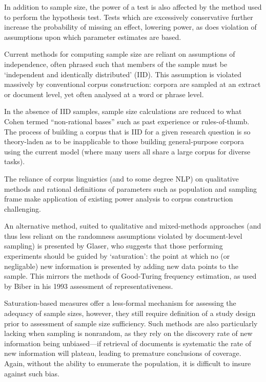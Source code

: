 In addition to sample size, the power of a test is also affected by the method used to perform the hypothesis test.  Tests which are excessively conservative further increase the probability of missing an effect, lowering power, as does violation of assumptions upon which parameter estimates are based.

Current methods for computing sample size are reliant on assumptions of independence, often phrased such that members of the sample must be `independent and identically distributed' (IID).  This assumption is violated massively by conventional corpus construction: corpora are sampled at an extract or document level, yet often analysed at a word or phrase level.

In the absence of IID samples, sample size calculations are reduced to what Cohen\cite[p. 145]{cohen1977statistical} termed ``non-rational bases'' such as past experience or rules-of-thumb.  The process of building a corpus that is IID for a given research question is so theory-laden as to be inapplicable to those building general-purpose corpora using the current model (where many users all share a large corpus for diverse tasks).

The reliance of corpus linguistics (and to some degree NLP) on qualitative methods and rational definitions of parameters such as population and sampling frame make application of existing power analysis to corpus construction challenging.

An alternative method, suited to qualitative and mixed-methods approaches (and thus less reliant on the randomness assumptions violated by document-level sampling) is presented by Glaser\cite{glaser1965qualitative}, who suggests that those performing experiments should be guided by `saturation': the point at which no (or negligable) new information is presented by adding new data points to the sample.  This mirrors the methods of Good-Turing frequency estimation\cite{GOOD01121953}, as used by Biber in his 1993 assessment of representativeness\cite{biber1993representativeness}.

Saturation-based measures offer a less-formal mechanism for assessing the adequacy of sample sizes, however, they still require definition of a study design prior to assessment of sample size sufficiency.  Such methods are also particularly lacking when sampling is nonrandom, as they rely on the discovery rate of new information being unbiased---if retrieval of documents is systematic the rate of new information will plateau, leading to premature conclusions of coverage.  Again, without the ability to enumerate the population, it is difficult to insure against such bias.




